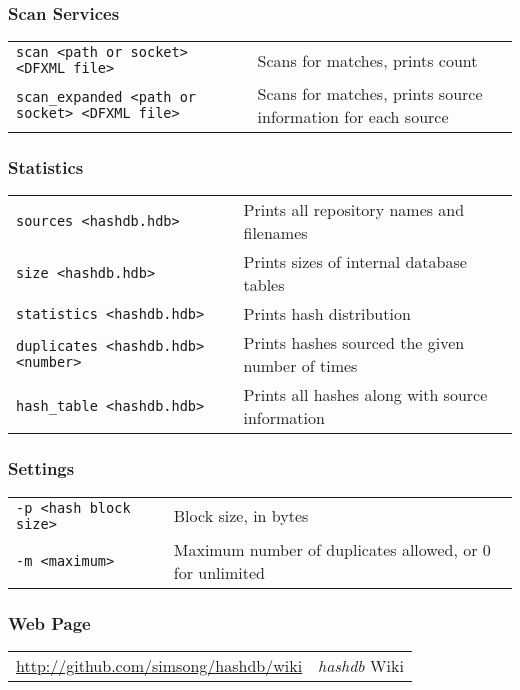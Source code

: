 \documentclass[12pt]{article}
\newcommand{\hdb}{\emph{hashdb}\xspace}
\begin{document}
\subsubsection*{Scan Services}
\begin{tabular}{p{8 cm} p{9 cm} }
\texttt{scan <path or socket> <DFXML file>} & Scans for matches, prints count\\
\texttt{scan\_expanded <path or socket> <DFXML file>} & Scans for matches, prints source information for each source \\
\end{tabular}

\subsubsection*{Statistics}
\begin{tabular}{p{8 cm} p{9 cm} }
\texttt{sources <hashdb.hdb>} & Prints all repository names and filenames \\
\texttt{size <hashdb.hdb>} & Prints sizes of internal database tables \\
\texttt{statistics <hashdb.hdb>} & Prints hash distribution \\
\texttt{duplicates <hashdb.hdb> <number>} & Prints hashes sourced the given number of times \\
\texttt{hash\_table <hashdb.hdb>} & Prints all hashes along with source information\\
\end{tabular}

\subsubsection*{Settings}
\begin{tabular}{p{8 cm} p{9 cm} }
\texttt{-p <hash block size>} & Block size, in bytes \\
\texttt{-m <maximum>} & Maximum number of duplicates allowed, or 0 for unlimited\\
\end{tabular}

\subsubsection*{Web Page}
\begin{tabular}{p{8 cm} p{9 cm} }
\url{http://github.com/simsong/hashdb/wiki} & \hdb Wiki \\
\end{tabular}
\end{document}
